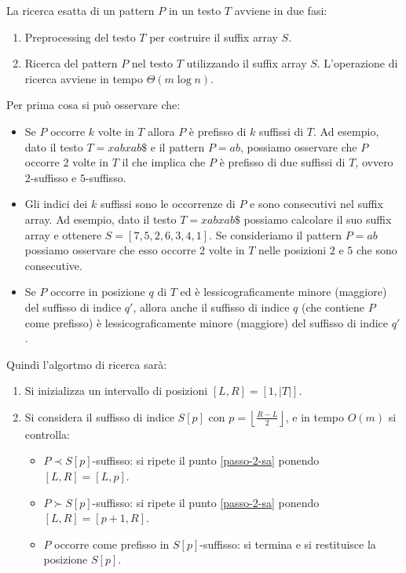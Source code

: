 La ricerca esatta di un pattern $P$ in un testo $T$ avviene in due fasi:
\begin{enumerate}
    \item Preprocessing del testo $T$ per costruire il suffix array $S$.
    \item Ricerca del pattern $P$ nel testo $T$ utilizzando il suffix array $S$.
          L'operazione di ricerca avviene in tempo $\Theta(m \log n)$.
\end{enumerate}
Per prima cosa si può osservare che:
\begin{itemize}
    \item Se $P$ occorre $k$ volte in $T$ allora $P$ è prefisso di $k$ suffissi
          di $T$. Ad esempio, dato il testo $T = xabxab\$$ e il pattern $P = ab$,
          possiamo osservare che $P$ occorre $2$ volte in $T$ il che implica che
          $P$ è prefisso di due suffissi di $T$, ovvero $2$-suffisso e
          $5$-suffisso.
    \item Gli indici dei $k$ suffissi sono le occorrenze di $P$ e sono consecutivi
          nel suffix array. Ad esempio, dato il testo $T = xabxab\$$ possiamo
          calcolare il suo suffix array e ottenere $S=[7, 5, 2, 6, 3, 4, 1]$. Se
          consideriamo il pattern $P = ab$ possiamo osservare che  esso occorre
          $2$ volte in $T$ nelle posizioni $2$ e $5$ che sono consecutive.
    \item Se $P$ occorre in posizione $q$ di $T$ ed è lessicograficamente minore
          (maggiore) del suffisso di indice $q'$, allora anche il suffisso di
          indice $q$ (che contiene $P$ come prefisso) è lessicograficamente
          minore (maggiore) del suffisso di indice $q'$.
\end{itemize}
Quindi l'algortmo di ricerca sarà:
\begin{enumerate}
    \item Si inizializza un intervallo di posizioni $[L,R] = [1, |T|]$.
    \item \label{passo-2-sa} Si considera il suffisso di indice $S[p]$ con
          $p = \left\lfloor \frac{R - L}{2} \right\rfloor$, e in tempo $O(m)$ si
          controlla:
          \begin{itemize}
              \item $P \prec S[p]$-suffisso: si ripete il punto \ref{passo-2-sa}
                    ponendo $[L, R] = [L, p]$.
              \item $P \succ S[p]$-suffisso: si ripete il punto \ref{passo-2-sa}
                    ponendo $[L, R] = [p + 1, R]$.
              \item $P$ occorre come prefisso in $S[p]$-suffisso: si termina e
                    si restituisce la posizione $S[p]$.
          \end{itemize}
\end{enumerate}
